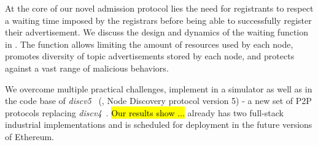 At the core of our novel admission protocol lies the need for registrants to respect a waiting time imposed by the registrars before being able to successfully register their advertisement.
We discuss the design and dynamics of the waiting function in .
The function allows limiting the amount of resources used by each node, promotes diversity of topic advertisements stored by each node, and protects against a vast range of malicious behaviors.


We overcome multiple practical challenges, implement \sysname in a simulator as well as in the code base of \emph{discv5}~\cite{discv5} (\ie, Node Discovery protocol version 5) - a new set of P2P protocols replacing \emph{discv4}~\cite{discv4}. 
\hl{Our results show ...}
\sysname already has two full-stack industrial implementations and is scheduled for deployment in the future versions of Ethereum.